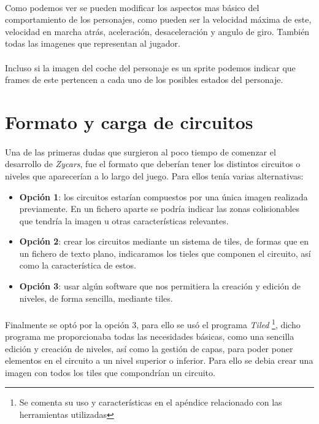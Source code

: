 \paragraph{}
Como podemos ver se pueden modificar los aspectos mas básico del comportamiento de los personajes, como pueden ser la velocidad 
máxima de este, velocidad en marcha atrás, aceleración, desaceleración y angulo de giro. También todas las imagenes que representan
al jugador.

\paragraph{}
Incluso si la imagen del coche del personaje es un sprite podemos indicar que frames de este pertencen a cada uno de los posibles 
estados del personaje.

\section{Formato y carga de circuitos}

\paragraph{}
Una de las primeras dudas que surgieron al poco tiempo de comenzar el desarrollo de \emph{Zycars}, fue el formato que deberían
tener los distintos circuitos o niveles que aparecerían a lo largo del juego. Para ellos tenía varias alternativas:

\begin{itemize}
    \item \textbf{Opción 1}: los circuitos estarían compuestos por una única imagen realizada previamente. En un fichero aparte se 
    podría indicar las zonas colisionables que tendría la imagen u otras características relevantes.
    
    \item \textbf{Opción 2}: crear los circuitos mediante un sistema de tiles, de formas que en un fichero de texto plano, indicaramos 
    los tieles que componen el circuito, así como la característica de estos.
    
    \item \textbf{Opción 3}: usar algún software que nos permitiera la creación y edición de niveles, de forma sencilla, mediante tiles.
\end{itemize}

\paragraph{}
Finalmente se optó por la opción 3, para ello se usó el programa \emph{Tiled} \footnote{Se comenta su uso y características en el
apéndice relacionado con las herramientas utilizadas}, dicho programa me proporcionaba todas las necesidades básicas, como una 
sencilla edición y creación de niveles, así como la gestión de capas, para poder poner elementos en el circuito a un nivel 
superior o inferior. Para ello se debia crear una imagen con todos los tiles que compondrían un circuito.


